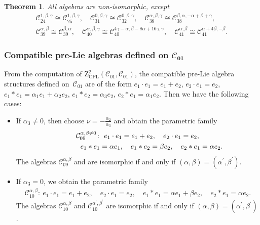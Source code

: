 \documentclass[pdftex]{sigma}
\numberwithin{equation}{section}
\newtheorem{Theorem}{Theorem}[section]
\begin{document}
\begin{Theorem}
All algebras are non-isomorphic, except
\begin{gather*}
\mathcal{C}_{24}^{1 ,\beta ,\gamma } \cong \mathcal{C}_{25}^{1 , \beta ,\gamma },\quad
\mathcal{C}_{31}^{0 ,\beta ,\gamma } \cong \mathcal{C}_{32}^{0 , \beta ,\gamma },\quad
\mathcal{C}_{38}^{\alpha ,\beta ,\gamma } \cong \mathcal{C}_{38}^{\beta ,\alpha , -\alpha +\beta +\gamma }, \\
 \mathcal{C}_{39}^{\alpha ,\beta } \cong \mathcal{C}_{39}^{\beta,\alpha},\quad
\mathcal{C}_{40}^{\alpha ,\beta ,\gamma } \cong \mathcal{C}_{40}^{4\gamma -\alpha ,\beta
-8\alpha +16\gamma ,\gamma },\quad
 \mathcal{C}_{41}^{\alpha ,\beta } \cong \mathcal{C}%
_{41}^{ \alpha +4\beta ,-\beta }.
\end{gather*}
\end{Theorem}

\subsubsection[Compatible pre-Lie algebras defined on C\_\{01\}]{Compatible pre-Lie algebras defined on $\boldsymbol{\mathcal{C}_{01}}$}

From the computation of $\mathrm{Z}_{\mathrm{CPL}}^{2}(\mathcal{C}_{01},%
\mathcal{C}_{01})$, the compatible pre-Lie algebra structures defined on~$%
\mathcal{C}_{01}$ are of the form
$e_{1}\cdot e_{1}=e_{1}+e_{2}$, $ e_{2}\cdot e_{1}=e_{2}$, $e_{1}\ast e_{1}=\alpha _{1}e_{1}+\alpha _{2}e_{2}$, $e_{1}\ast
e_{2}=\alpha _{3}e_{2}$, $e_{2}\ast e_{1}=\alpha _{1}e_{2}$.
Then we have the following cases:
\begin{itemize}\itemsep=0pt
\item If $\alpha _{3}\neq 0$, then choose $\nu =-\frac{\alpha _{2}}{\alpha
_{3}}$ and obtain the parametric family
\begin{gather*}
\mathcal{C}_{09}^{\alpha ,\beta \neq 0} \colon \
e_{1}\cdot e_{1}=e_{1}+e_{2},\quad e_{2}\cdot e_{1}=e_{2},\\
\hphantom{\mathcal{C}_{09}^{\alpha ,\beta \neq 0} \colon} \ e_{1}\ast e_{1}=\alpha e_{1},\quad e_{1}\ast e_{2}=\beta e_{2},\quad
e_{2}\ast e_{1}=\alpha e_{2}.
\end{gather*}
The algebras $\mathcal{C}_{09}^{\alpha ,\beta }$ and \smash{$\mathcal{C}_{09}^{\alpha
^{\prime },\beta ^{\prime }}$} are isomorphic if and only if $(\alpha,\beta)= (\alpha^{\prime },\beta ^{\prime })$.

\item If $\alpha _{3}=0$, we obtain the parametric family
\begin{gather*}
\mathcal{C}_{10}^{\alpha ,\beta }\colon \
e_{1}\cdot e_{1}=e_{1}+e_{2},\quad e_{2}\cdot e_{1}=e_{2}, \quad e_{1}\ast e_{1}=\alpha e_{1}+\beta e_{2},\quad e_{2}\ast e_{1}=\alpha e_{2}.
\end{gather*}
The algebras $\mathcal{C}_{10}^{\alpha ,\beta }$ and $\mathcal{C}_{10}^{\alpha
^{\prime },\beta ^{\prime }}$ are isomorphic if and only if $(\alpha,\beta)= (\alpha^{\prime },\beta ^{\prime })$.
\end{itemize}
\end{document}
